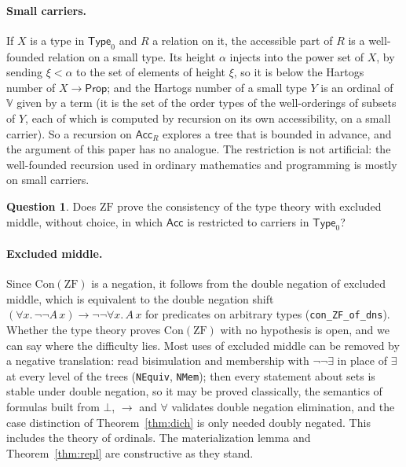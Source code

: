 \documentclass[10pt]{article}
\theoremstyle{definition}
\newtheorem{question}[theorem]{Question}
\theoremstyle{remark}
\newcommand{\Prop}{\mathsf{Prop}}
\newcommand{\Type}{\mathsf{Type}}
\newcommand{\ZF}{\mathrm{ZF}}
\newcommand{\Con}{\mathrm{Con}}
\newcommand{\Acc}{\mathsf{Acc}}
\newcommand{\V}{\mathbb{V}}
\newcommand{\lean}[1]{\texttt{#1}}
\begin{document}
\paragraph{Small carriers.}
If $X$ is a type in $\Type_0$ and $R$ a relation on it, the accessible
part of $R$ is a well-founded relation on a small type. Its height $\alpha$
injects into the power set of $X$, by sending $\xi<\alpha$ to the set of
elements of height $\xi$, so it is below the Hartogs number of
$X\to\Prop$; and the Hartogs number of a small type $Y$ is an ordinal of
$\V$ given by a term (it is the set of the order types of the
well-orderings of subsets of $Y$, each of which is computed by recursion
on its own accessibility, on a small carrier). So a recursion
on $\Acc_R$ explores a tree that is bounded in advance, and the argument
of this paper has no analogue. The restriction is not artificial: the
well-founded recursion used in ordinary mathematics and programming is
mostly on small carriers.

\begin{question}\label{q:small}
Does $\ZF$ prove the consistency of the type theory with excluded
middle, without choice, in which $\Acc$ is restricted to carriers in
$\Type_0$?
\end{question}

\paragraph{Excluded middle.}
Since $\Con(\ZF)$ is a negation, it follows from the double negation of
excluded middle, which is equivalent to the double negation shift
$(\forall x.\,\neg\neg A\,x)\to\neg\neg\forall x.\,A\,x$ for predicates on arbitrary types
(\lean{con\_ZF\_of\_dns}). Whether the type theory proves $\Con(\ZF)$ with
no hypothesis is open, and we can say where the difficulty lies. Most
uses of excluded middle can be removed by a negative translation: read
bisimulation and membership with $\neg\neg\exists$ in place of $\exists$ at every
level of the trees (\lean{NEquiv}, \lean{NMem}); then every statement
about sets is stable under double negation, so it may be proved
classically, the semantics of formulas built from $\bot$, $\to$ and $\forall$
validates double negation elimination, and the case distinction of
Theorem~\ref{thm:dich} is only needed doubly negated. This includes
the theory of ordinals. The materialization lemma and
Theorem~\ref{thm:repl} are constructive as they stand.
\end{document}
